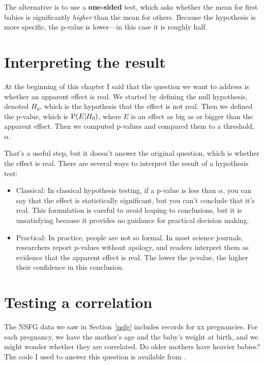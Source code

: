 \documentclass[12pt]{book}
\begin{document}
The alternative is to use a {\bf one-sided} test, which asks whether
the mean for first babies is significantly {\em higher} than
the mean for others.  Because the hypothesis is more specific, the
p-value is lower---in this case it is roughly half.


\section{Interpreting the result}

At the beginning of this chapter I said that the question we want to
address is whether an apparent effect is real.  We started by defining
the null hypothesis, denoted $H_{0}$, which is the hypothesis that
the effect is not real.  Then we defined the p-value, which is
$\mathrm{P}(E|H_{0})$, where $E$ is an effect as big as or bigger
than the apparent effect.  Then we computed p-values and compared them
to a threshold, $\alpha$.

That's a useful step, but it doesn't answer the original question,
which is whether the effect is real.  There are several ways to
interpret the result of a hypothesis test:

\begin{itemize}

\item Classical: In classical hypothesis testing, if a p-value
  is less than $\alpha$, you can say that the effect is statistically
  significant, but you can't conclude that it's real.  This
  formulation is careful to avoid leaping to conclusions, but it is
  unsatisfying because it provides no guidance for practical
  decision making.

\item Practical: In practice, people are not so formal.  In most
  science journals, researchers report p-values without apology, and
  readers interpret them as evidence that the apparent effect is real.
  The lower the p-value, the higher their confidence in this
  conclusion.

\end{itemize}


\section{Testing a correlation}

The NSFG data we saw in Section~\ref{nsfg} includes records for
xx pregnancies.  For each pregnancy, we have the mother's age
and the baby's weight at birth, and we might wonder whether they
are correlated.  Do older mothers have heavier babies?  The
code I used to answer this question is available from
\url{}.
\end{document}
